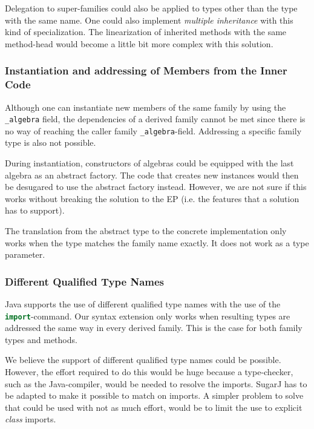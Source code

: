 \documentclass{report}
\begin{document}
Delegation to super-families could also be applied to types other than the type with the same name. One could also implement \emph{multiple inheritance} with this kind of specialization. The linearization of inherited methods with the same method-head would become a little bit more complex with this solution.

\subsubsection*{Instantiation and addressing of Members from the Inner Code}

Although one can instantiate new members of the same family by using the \lstinline[language=java]{_algebra} field, the dependencies of a derived family cannot be met since there is no way of reaching the caller family \lstinline[language=java]{_algebra}-field.
Addressing a specific family type is also not possible.

During instantiation, constructors of algebras could be equipped with the last algebra as an abstract factory. The code that creates new instances would then be desugared to use the abstract factory instead. However, we are not sure if this works without breaking the solution to the EP (i.e. the features that a solution has to support).

The translation from the abstract type to the concrete implementation only works when the type matches the family name exactly. It does not work as a type parameter.

\subsubsection*{Different Qualified Type Names}

Java supports the use of different qualified type names with the use of the \lstinline[language=java]{import}-command. Our syntax extension only works when resulting types are addressed the same way in every derived family. This is the case for both family types and methods.


We believe the support of different qualified type names could be possible. However, the effort required to do this would be huge because a type-checker, such as the Java-compiler, would be needed to resolve the imports. SugarJ has to be adapted to make it possible to match on imports. A simpler problem to solve that could be used with not as much effort, would be to limit the use to explicit \emph{class} imports.
\end{document}
